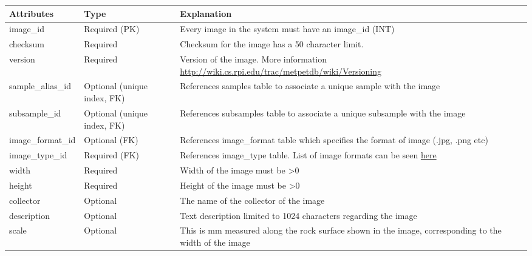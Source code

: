\documentclass[letterpaper,10pt,english]{sphinxmanual}
\begin{document}
\begin{tabulary}{\linewidth}{|L|L|L|}
\hline
\textbf{
Attributes
} & \textbf{
Type
} & \textbf{
Explanation
}\\\hline

image\_id
 & 
Required (PK)
 & 
Every image in the system must have an image\_id (INT)
\\\hline

checksum
 & 
Required
 & 
Checksum for the image has a 50 character limit.
\\\hline

version
 & 
Required
 & 
Version of the image.
More information \href{http://wiki.cs.rpi.edu/trac/metpetdb/wiki/Versioning}{http://wiki.cs.rpi.edu/trac/metpetdb/wiki/Versioning}
\\\hline

sample\_alias\_id
 & 
Optional (unique
index, FK)
 & 
References samples table to associate a unique sample with the image
\\\hline

subsample\_id
 & 
Optional (unique
index, FK)
 & 
References subsamples table to associate a unique subsample with the image
\\\hline

image\_format\_id
 & 
Optional (FK)
 & 
References image\_format table which specifies the format of
image (.jpg, .png etc)
\\\hline

image\_type\_id
 & 
Required (FK)
 & 
References image\_type table. List of image formats can be seen
\href{http://wiki.cs.rpi.edu/trac/metpetdb/wiki/Image\#Types}{here}
\\\hline

width
 & 
Required
 & 
Width of the image must be \textgreater{}0
\\\hline

height
 & 
Required
 & 
Height of the image must be \textgreater{}0
\\\hline

collector
 & 
Optional
 & 
The name of the collector of the image
\\\hline

description
 & 
Optional
 & 
Text description limited to 1024 characters regarding the image
\\\hline

scale
 & 
Optional
 & 
This is mm measured along the rock surface shown in the image,
corresponding to the width of the image
\\\hline


\end{tabulary}
\end{document}
